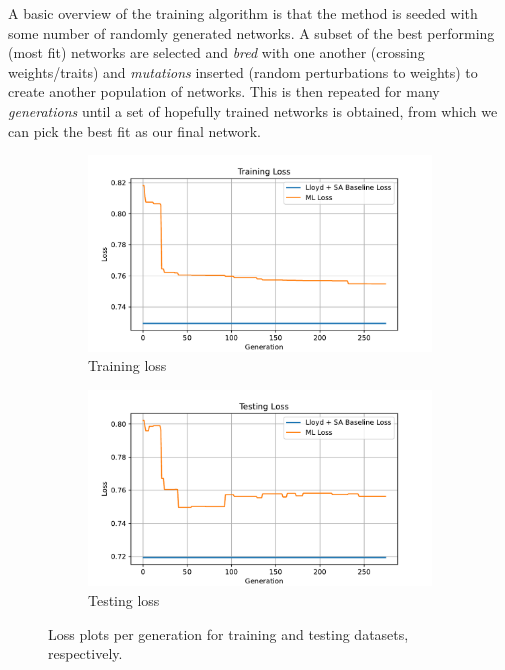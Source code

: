 \documentclass{article}
\begin{document}
A basic overview of the training algorithm is that the method is seeded with some number of randomly generated networks. A subset of the best performing (most fit) networks are selected and \textit{bred} with one another (crossing weights/traits) and \textit{mutations} inserted (random perturbations to weights) to create another population of networks.  This is then repeated for many \textit{generations} until a set of hopefully trained networks is obtained, from which we can pick the best fit as our final network.

\begin{figure}[h]
  \centering
  \begin{subfigure}[t]{0.49\textwidth}
    \centering
    \includegraphics[width=\textwidth]{train_loss.pdf}
    \caption{Training loss}
  \end{subfigure}
  \hfill
  \begin{subfigure}[t]{0.49\textwidth}
    \centering
    \includegraphics[width=\textwidth]{test_loss.pdf}
    \caption{Testing loss}
  \end{subfigure}
  \caption{Loss plots per generation for training and testing datasets, respectively.}
  \label{fig:loss}
\end{figure}
\end{document}
